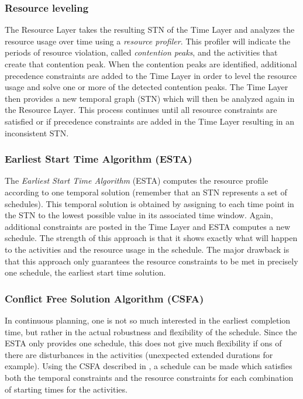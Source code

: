 \documentclass{article}
\begin{document}
\subsubsection{Resource leveling}
The Resource Layer takes the resulting STN of the Time Layer and analyzes the resource usage over time using a \emph{resource profiler}. This profiler will indicate the periods of resource violation, called \emph{contention peaks}, and the activities that create that contention peak. When the contention peaks are identified, additional precedence constraints are added to the Time Layer in order to level the resource usage and solve one or more of the detected contention peaks. The Time Layer then provides a new temporal graph (STN) which will then be analyzed again in the Resource Layer. This process continues until all resource constraints are satisfied or if precedence constraints are added in the Time Layer resulting in an inconsistent STN. 

\subsubsection{Earliest Start Time Algorithm (ESTA)}
The \emph{Earliest Start Time Algorithm} (ESTA) computes the resource profile according to one temporal solution (remember that an STN represents a set of schedules). This temporal solution is obtained by assigning to each time point in the STN to the lowest possible value in its associated time window. Again, additional constraints are posted in the Time Layer and ESTA computes a new schedule. The strength of this approach is that it shows exactly what will happen to the activities and the resource usage in the schedule. The major drawback is that this approach only guarantees the resource constraints to be met in precisely one schedule, the earliest start time solution. 

\subsubsection{Conflict Free Solution Algorithm (CSFA)}
In continuous planning, one is not so much interested in the earliest completion time, but rather in the actual robustness and flexibility of the schedule. Since the ESTA only provides one schedule, this does not give much flexibility if ons of there are disturbances in the activities (unexpected extended durations for example). Using the CSFA described in \cite{cesta98}, a schedule can be made which satisfies both the temporal constraints and the resource constraints for each combination of starting times for the activities.
\end{document}
